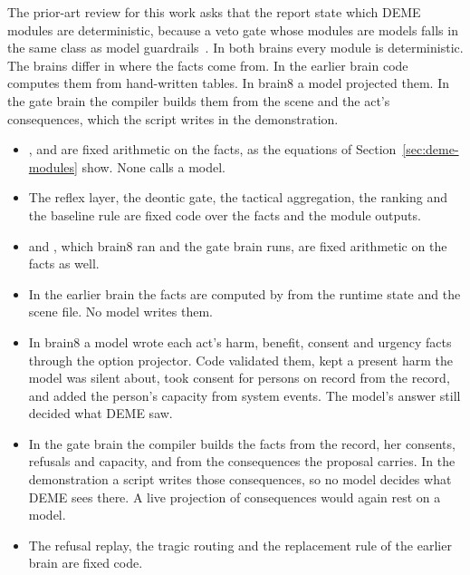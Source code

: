The prior-art review for this work asks that the report state which DEME modules are
deterministic, because a veto gate whose modules are models falls in the same class as model
guardrails~\cite{rebedea2023nemo,inan2023llamaguard}. In both brains every module is
deterministic. The brains differ in where the facts come from. In the earlier brain code computes
them from hand-written tables. In brain8 a model projected them. In the gate brain the compiler
builds them from the scene and the act's consequences, which the script writes in the
demonstration.

\begin{itemize}
\item {},  and  are fixed
arithmetic on the facts, as the equations of Section~\ref{sec:deme-modules} show. None calls a
model.
\item The reflex layer, the deontic gate, the tactical aggregation, the ranking and the
baseline rule are fixed code over the facts and the module outputs.
\item {} and , which brain8 ran and the gate
brain runs, are fixed arithmetic on the facts as well.
\item In the earlier brain the facts are computed by  from the runtime
state and the scene file. No model writes them.
\item In brain8 a model wrote each act's harm, benefit, consent and urgency
facts through the option projector. Code validated them, kept a present harm the model was silent
about, took consent for persons on record from the record, and added the person's capacity from
system events. The model's answer still decided what DEME saw.
\item In the gate brain the compiler builds the facts from the record, her consents, refusals and
capacity, and from the consequences the proposal carries. In the demonstration a script writes
those consequences, so no model decides what DEME sees there. A live projection of consequences
would again rest on a model.
\item The refusal replay, the tragic routing and the replacement rule of the earlier brain are
fixed code.
\end{itemize}

